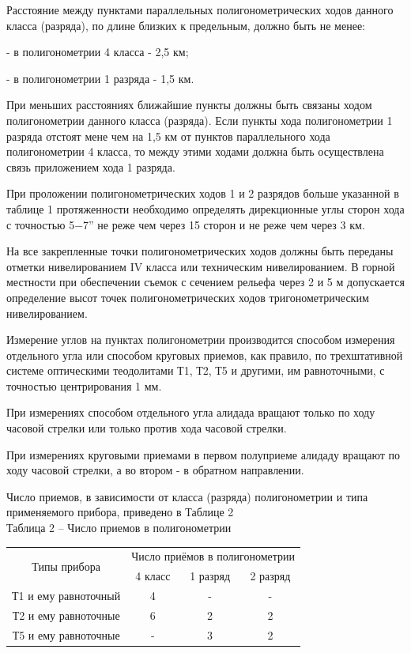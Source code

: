 \documentclass[a4paper]{article}
\begin{document}
\begin{newpage}
{        \par Расстояние между пунктами параллельных полигонометрических ходов данного класса (разряда), по длине близких к предельным, должно быть не менее:
        \par - в полигонометрии 4 класса - 2,5 км;
        \par - в полигонометрии 1 разряда - 1,5 км.
        \par При меньших расстояниях ближайшие пункты должны быть связаны ходом полигонометрии данного класса (разряда). Если пункты хода полигонометрии 1 разряда отстоят мене чем на 1,5 км от пунктов параллельного хода полигонометрии 4 класса, то между этими ходами должна быть осуществлена связь приложением хода 1 разряда.
        \par При проложении полигонометрических ходов 1 и 2 разрядов больше указанной в таблице 1 протяженности необходимо определять дирекционные углы сторон хода с точностью 5−7” не реже чем через 15 сторон и не реже чем через 3 км.
        \par На все закрепленные точки полигонометрических ходов должны быть переданы отметки нивелированием IV класса или техническим нивелированием. В горной местности при обеспечении съемок с сечением рельефа через 2 и 5 м допускается определение высот точек полигонометрических ходов тригонометрическим нивелированием.
        \par Измерение углов на пунктах полигонометрии производится способом измерения отдельного угла или способом круговых приемов, как правило, по трехштативной системе оптическими теодолитами Т1, Т2, Т5 и другими, им равноточными, с точностью центрирования 1 мм.
        \par При измерениях способом отдельного угла алидада вращают только по ходу часовой стрелки или только против хода часовой стрелки.
        \par При измерениях круговыми приемами в первом полуприеме алидаду вращают по ходу часовой стрелки, а во втором - в обратном направлении.
        \par Число приемов, в зависимости от класса (разряда) полигонометрии и типа применяемого прибора, приведено в Таблице 2\\
        
        Таблица 2 – Число приемов в полигонометрии
        \begin{center}
            \begin{tabular}{|c|c|c|c|}
                \hline
                \multirow{2}{*}{Типы прибора} & \multicolumn{3}{c|}{Число приёмов в полигонометрии}\\
                \cline{2-4}
                & 4 класс & 1 разряд & 2 разряд\\
                \hline
                Т1 и ему равноточный & 4 & - & -\\
                \hline
                Т2 и ему равноточные & 6 & 2 & 2\\
                \hline
                Т5 и ему равноточные  & - & 3 & 2\\
                \hline
            \end{tabular}
        \end{center}
        
}
\end{newpage}
\end{document}
